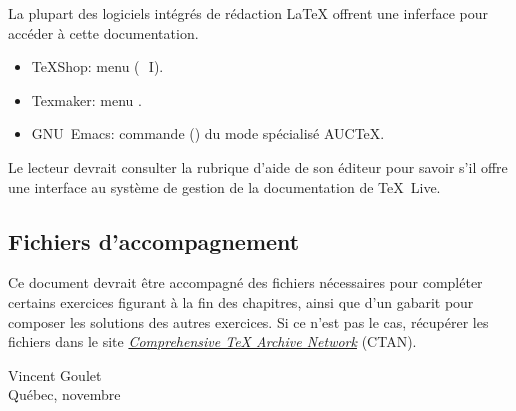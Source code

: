 La plupart des logiciels intégrés de rédaction {\LaTeX} offrent une
inferface pour accéder à cette documentation.
\begin{itemize}
\item TeXShop: menu  (\optkey\,\cmdkey\, I).
\item Texmaker: menu .
\item GNU~Emacs: commande  () du mode
  spécialisé AUC{\TeX}.
\end{itemize}
Le lecteur devrait consulter la rubrique d'aide de son éditeur pour
savoir s'il offre une interface au système de gestion de la
documentation  de {\TeX}~Live.

\subsection*{Fichiers d'accompagnement}

Ce document devrait être accompagné des fichiers nécessaires pour
compléter certains exercices figurant à la fin des chapitres, ainsi
que d'un gabarit  pour composer les
solutions des autres exercices. Si ce n'est pas le cas, récupérer les
fichiers dans le site \href{\ctanurl}{\emph{Comprehensive TeX Archive
    Network}} (CTAN).

\begin{flushright}
  Vincent Goulet \\
  Québec, novembre \year
\end{flushright}


